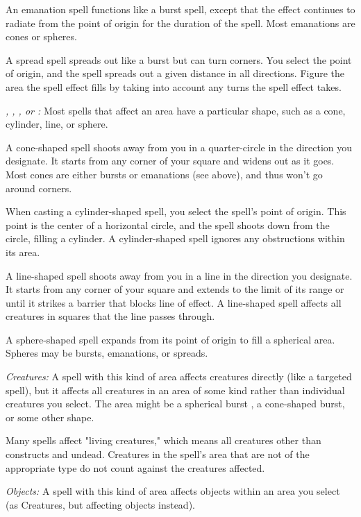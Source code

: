 An emanation spell functions like a burst spell, except that the effect continues 
to radiate from the point of origin for the duration of the spell. Most emanations 
are cones or spheres.

A spread spell spreads out like a burst but can turn corners. You select the point 
of origin, and the spell spreads out a given distance in all directions. Figure 
the area the spell effect fills by taking into account any turns the spell effect 
takes.

\textit{, , , or :}
Most spells that affect an area have 
a particular shape, such as a cone, cylinder, line, or sphere.

A cone-shaped spell shoots away from you in a quarter-circle in the direction you 
designate. It starts from any corner of your square and widens out as it goes. 
Most cones are either bursts or emanations (see above), and thus won't go around 
corners.

When casting a cylinder-shaped spell, you select the spell's point of origin. This 
point is the center of a horizontal circle, and the spell shoots down from the 
circle, filling a cylinder. A cylinder-shaped spell ignores any obstructions within 
its area.

A line-shaped spell shoots away from you in a line in the direction you designate. 
It starts from any corner of your square and extends to the limit of its range 
or until it strikes a barrier that blocks line of effect. A line-shaped spell affects 
all creatures in squares that the line passes through.

A sphere-shaped spell expands from its point of origin to fill a spherical area. 
Spheres may be bursts, emanations, or spreads.

\textit{Creatures:} A spell with this kind of area affects creatures directly (like 
a targeted spell), but it affects all creatures in an area of some kind rather 
than individual creatures you select. The area might be a spherical burst , a cone-shaped 
burst, or some other shape.

Many spells affect "living creatures," which means all creatures other than constructs 
and undead. Creatures in the spell's area that are not of the appropriate type 
do not count against the creatures affected.

\textit{Objects:} A spell with this kind of area affects objects within an area 
you select (as Creatures, but affecting objects instead).

